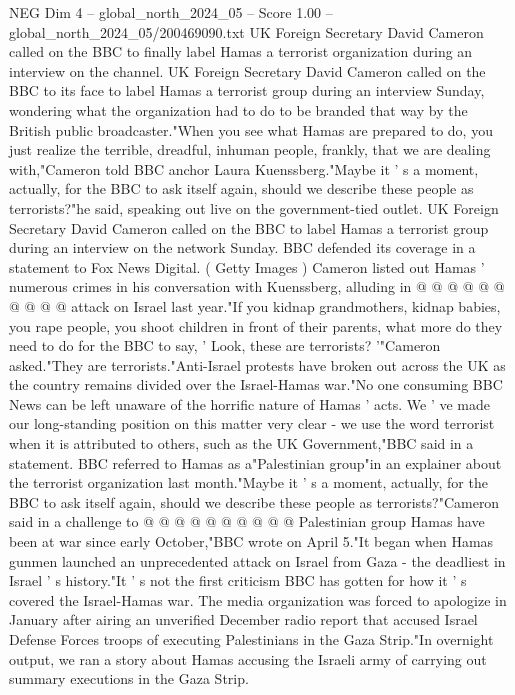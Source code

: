 \begin{textsample}{NEG Dim 4 – global\_north\_2024\_05 – Score 1.00 – global\_north\_2024\_05/200469090.txt}  \label{ex:f4_neg_120}
UK Foreign Secretary David Cameron called on the BBC to finally label Hamas a terrorist organization during an interview on the channel.
UK Foreign Secretary David Cameron called on the BBC to its face to label Hamas a terrorist group during an interview Sunday, wondering what the organization had to do to be branded that way by the British public broadcaster."When you see what Hamas are prepared to do, you just realize the terrible, dreadful, inhuman people, frankly, that we are dealing with,"Cameron told BBC anchor Laura Kuenssberg."Maybe it ' s a moment, actually, for the BBC to ask itself again, should we describe these people as terrorists?"he said, speaking out live on the government-tied outlet.
UK Foreign Secretary David Cameron called on the BBC to label Hamas a terrorist group during an interview on the network Sunday.
BBC defended its coverage in a statement to Fox News Digital. ( Getty Images ) Cameron listed out Hamas ' numerous crimes in his conversation with Kuenssberg, alluding in @ @ @ @ @ @ @ @ @ @ attack on Israel last year."If you kidnap grandmothers, kidnap babies, you rape people, you shoot children in front of their parents, what more do they need to do for the BBC to say, ' Look, these are terrorists? '"Cameron asked."They are terrorists."Anti-Israel protests have broken out across the UK as the country remains divided over the Israel-Hamas war."No one consuming BBC News can be left unaware of the horrific nature of Hamas ' acts.
We ' ve made our long-standing position on this matter very clear - we use the word terrorist when it is attributed to others, such as the UK Government,"BBC said in a statement.
BBC referred to Hamas as a"Palestinian group"in an explainer about the terrorist organization last month."Maybe it ' s a moment, actually, for the BBC to ask itself again, should we describe these people as terrorists?"Cameron said in a challenge to @ @ @ @ @ @ @ @ @ @ Palestinian group Hamas have been at war since early October,"BBC wrote on April 5."It began when Hamas gunmen launched an unprecedented attack on Israel from Gaza - the deadliest in Israel ' s history."It ' s not the first criticism BBC has gotten for how it ' s covered the Israel-Hamas war.
The media organization was forced to apologize in January after airing an unverified December radio report that accused Israel Defense Forces troops of executing Palestinians in the Gaza Strip."In overnight output, we ran a story about Hamas accusing the Israeli army of carrying out summary executions in the Gaza Strip.

\end{textsample}
